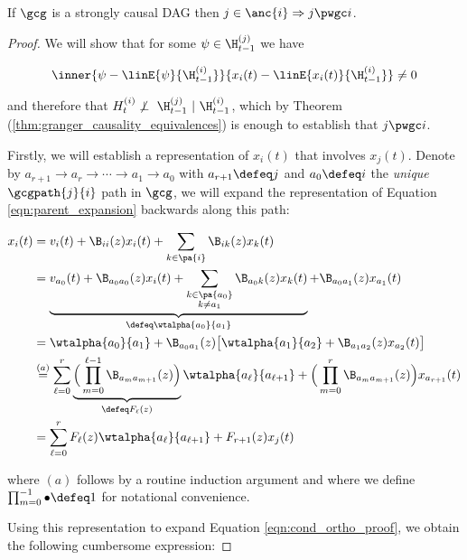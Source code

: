 \begin{proposition}
  \label{prop:pwgc_anc}
  If $\gcg$ is a strongly causal DAG then $j \in \anc{i} \Rightarrow j \pwgc i$.
\end{proposition}
\begin{proof}
  We will show that for some $\psi \in \H_{t - 1}^{(j)}$ we have

  \begin{equation}
    \label{eqn:cond_ortho_proof}
    \inner{\psi - \linE{\psi}{\H_{t - 1}^{(i)}}}{x_i(t) - \linE{x_i(t)}{\H_{t - 1}^{(i)}}} \ne 0
  \end{equation}

  and therefore that $H_t^{(i)} \not\perp\ \H_{t - 1}^{(j)}\ |\ \H_{t - 1}^{(i)}$, which by Theorem (\ref{thm:granger_causality_equivalences}) is enough to establish that $j \pwgc i$.

  Firstly, we will establish a representation of $x_i(t)$ that involves $x_j(t)$.  Denote by $a_{r + 1} \rightarrow a_r \rightarrow \cdots \rightarrow a_1 \rightarrow a_0$ with $a_{r + 1} \defeq j$ and $a_0 \defeq i$ the \textit{unique} $\gcgpath{j}{i}$ path in $\gcg$, we will expand the representation of Equation \eqref{eqn:parent_expansion} backwards along this path:

  \begin{align*}
    x_i(t) &= v_i(t) + \B_{ii}(z) x_i(t) + \sum_{k \in \pa{i}}\B_{ik}(z) x_k(t)\\
           &= \underbrace{v_{a_0}(t) + \B_{a_0a_0}(z) x_i(t) + \sum_{\substack{k \in \pa{a_0} \\ k \ne a_1}}\B_{a_0 k}(z) x_k(t)}_{\defeq \wtalpha{a_0}{a_1}} + \B_{a_0a_1}(z)x_{a_1}(t)\\
           &= \wtalpha{a_0}{a_1} + \B_{a_0a_1}(z)\big[\wtalpha{a_1}{a_2} + \B_{a_1a_2}(z)x_{a_2}(t) \big]\\
           &\overset{(a)}{=} \sum_{\ell = 0}^r \underbrace{\Big(\prod_{m = 0}^{\ell - 1} \B_{a_m a_{m + 1}}(z) \Big)}_{\defeq F_\ell(z)} \wtalpha{a_\ell}{a_{\ell + 1}} + \Big(\prod_{m = 0}^{r}\B_{a_m a_{m + 1}}(z)\Big)x_{a_{r + 1}}(t)\\
           &= \sum_{\ell = 0}^r F_\ell(z) \wtalpha{a_\ell}{a_{\ell + 1}} + F_{r + 1}(z) x_j(t)
  \end{align*}

  where $(a)$ follows by a routine induction argument and where we define $\prod_{m = 0}^{-1} \bullet \defeq 1$ for notational convenience.

  Using this representation to expand Equation \eqref{eqn:cond_ortho_proof}, we obtain the following cumbersome expression:


\end{proof}
